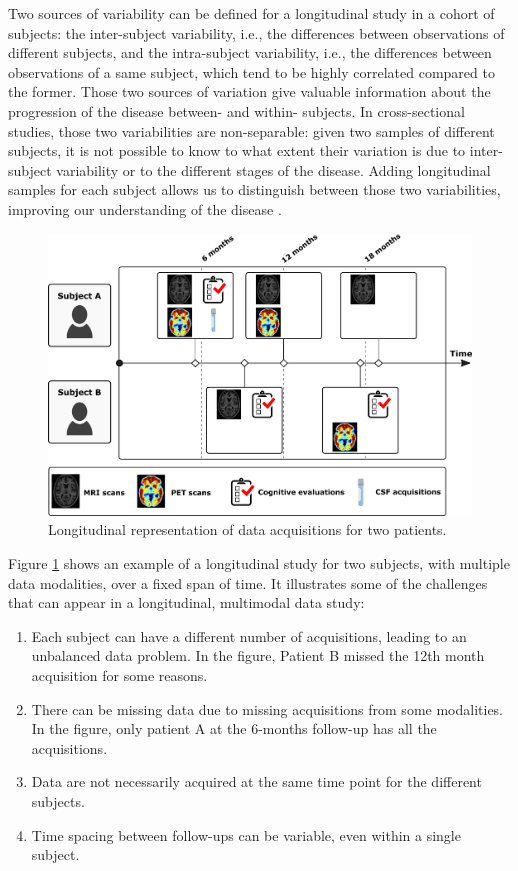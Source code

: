 Two sources of variability can be defined for a longitudinal study in a cohort of subjects: the inter-subject variability, i.e., the differences between observations of different subjects, and the intra-subject variability, i.e., the differences between observations of a same subject, which tend to be highly correlated compared to the former. Those two sources of variation give valuable information about the progression of the disease between- and within- subjects. In cross-sectional studies, those two variabilities are non-separable: given two samples of different subjects, it is not possible to know to what extent their variation is due to inter-subject variability or to the different stages of the disease. Adding longitudinal samples for each subject allows us to distinguish between those two variabilities, improving our understanding of the disease \cite{Fitzmaurice2008}. \\

\begin{figure}[htbp]
  \centering
  \includegraphics[width=1.0\textwidth]{figures/introduction/Fig-progression.pdf}
  \caption{Longitudinal representation of data acquisitions for two patients.}
  \label{long}
\end{figure}

Figure \ref{long} shows an example of a longitudinal study for two subjects, with multiple data modalities, over a fixed span of time. It illustrates some of the challenges that can appear in a longitudinal, multimodal data study: \\

\begin{enumerate}
\item Each subject can have a different number of acquisitions, leading to an unbalanced data problem. In the figure, Patient B missed the 12th month acquisition for some reasons.
\item There can be missing data due to missing acquisitions from some modalities. In the figure, only patient A at the 6-months follow-up has all the acquisitions.
\item Data are not necessarily acquired at the same time point for the different subjects.
\item Time spacing between follow-ups can be variable, even within a single subject.
\end{enumerate}

